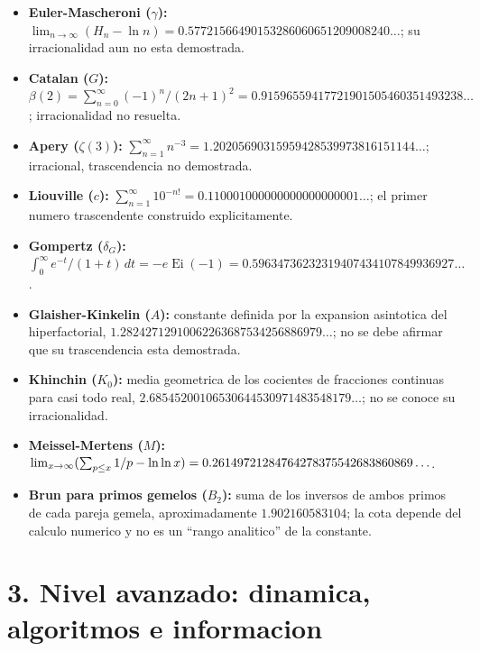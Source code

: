 \documentclass[11pt,a4paper]{article}
\begin{document}
\begin{itemize}
  \item \textbf{Euler-Mascheroni ($\gamma$):} $\lim_{n\to\infty}(H_n-\ln n)=0.57721566490153286060651209008240\ldots$; su irracionalidad aun no esta demostrada.
  \item \textbf{Catalan ($G$):} $\beta(2)=\sum_{n=0}^\infty(-1)^n/(2n+1)^2=0.91596559417721901505460351493238\ldots$; irracionalidad no resuelta.
  \item \textbf{Apery ($\zeta(3)$):} $\sum_{n=1}^\infty n^{-3}=1.20205690315959428539973816151144\ldots$; irracional, trascendencia no demostrada.
  \item \textbf{Liouville ($c$):} $\sum_{n=1}^\infty 10^{-n!}=0.110001000000000000000001\ldots$; el primer numero trascendente construido explicitamente.
  \item \textbf{Gompertz ($\delta_G$):} $\int_0^\infty e^{-t}/(1+t)\,dt=-e\operatorname{Ei}(-1)=0.59634736232319407434107849936927\ldots$.
  \item \textbf{Glaisher-Kinkelin ($A$):} constante definida por la expansion asintotica del hiperfactorial, $1.28242712910062263687534256886979\ldots$; no se debe afirmar que su trascendencia esta demostrada.
  \item \textbf{Khinchin ($K_0$):} media geometrica de los cocientes de fracciones continuas para casi todo real, $2.68545200106530644530971483548179\ldots$; no se conoce su irracionalidad.
  \item \textbf{Meissel-Mertens ($M$):} $\lim_{x\to\infty}(\sum_{p\le x}1/p-\ln\ln x)=\newline 0.26149721284764278375542683860869\ldots$.
  \item \textbf{Brun para primos gemelos ($B_2$):} suma de los inversos de ambos primos de cada pareja gemela, aproximadamente $1.902160583104$; la cota depende del calculo numerico y no es un ``rango analitico'' de la constante.
\end{itemize}

\section*{3. Nivel avanzado: dinamica, algoritmos e informacion}
\end{document}
